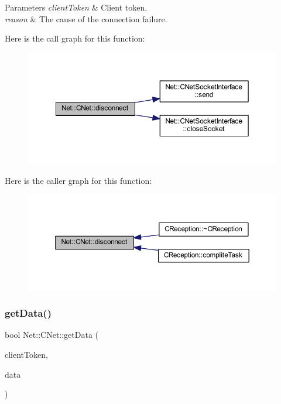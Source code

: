\begin{DoxyParams}{Parameters}
{\em client\+Token} & Client token. \\
\hline
{\em reason} & The cause of the connection failure. \\
\hline
\end{DoxyParams}
Here is the call graph for this function\+:
\nopagebreak
\begin{figure}[H]
\begin{center}
\leavevmode
\includegraphics[width=350pt]{class_net_1_1_c_net_a7f66009e63ed53b541331143bb2f4bfb_cgraph}
\end{center}
\end{figure}
Here is the caller graph for this function\+:
\nopagebreak
\begin{figure}[H]
\begin{center}
\leavevmode
\includegraphics[width=350pt]{class_net_1_1_c_net_a7f66009e63ed53b541331143bb2f4bfb_icgraph}
\end{center}
\end{figure}
\mbox{\label{class_net_1_1_c_net_a77d474d293656443de888283db8a74f0}} 
\subsubsection{\texorpdfstring{get\+Data()}{getData()}}
{\footnotesize\ttfamily bool Net\+::\+C\+Net\+::get\+Data (\begin{DoxyParamCaption}\item[{const \mbox{\hyperlink{struct_net_1_1_s_token}{S\+Token}} \&}]{client\+Token,  }\item[{std\+::string \&}]{data }\end{DoxyParamCaption})}



